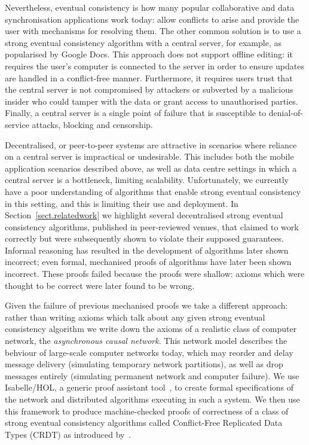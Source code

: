 \documentclass[acmlarge,review,anonymous]{acmart}\settopmatter{printfolios=true}
\begin{document}
Nevertheless, eventual consistency is how many popular collaborative and data synchronisation applications work today: allow
conflicts to arise and provide the user with mechanisms for resolving them.
The other common solution is to use a strong eventual consistency algorithm with a central server, for example, as popularised by Google Docs.
This approach does not support offline editing: it requires the user's computer is connected to the server in order to ensure updates are handled in a conflict-free manner.
Furthermore, it requires users trust that the central server is not compromised by attackers or subverted by a malicious insider who could tamper with the data or grant access to unauthorised parties.
Finally, a central server is a single point of failure that is susceptible to denial-of-service attacks, blocking and censorship.

Decentralised, or peer-to-peer systems are attractive in scenarios where reliance on a central server is impractical or undesirable.
This includes both the mobile application scenarios described above, as well as data centre settings in which a central server is a bottleneck, limiting scalability.
Unfortunately, we currently have a poor understanding of algorithms that enable strong eventual consistency in this setting, and this is limiting their use and deployment.
In Section~\ref{sect.relatedwork} we highlight several decentralised strong eventual consistency algorithms, published in peer-reviewed venues, that claimed to work correctly but were subsequently shown to violate their supposed guarantees. 
Informal reasoning has resulted in the development of algorithms later shown incorrect; even formal, mechanised proofs of algorithms have later been shown incorrect.
These proofs failed because the proofs were shallow: axioms which were thought to be correct were later found to be wrong.

Given the failure of previous mechanised proofs we take a different approach: rather than writing axioms which talk about any given strong eventual consistency algorithm we write down the axioms of a realistic class of computer network, the \emph{asynchronous causal network}.
This network model describes the behviour of large-scale computer networks today, which may reorder and delay message delivery (simulating temporary network partitions), as well as drop messages entirely (simulating permanent network and computer failure).
We use Isabelle/HOL, a generic proof assistant tool~\cite{DBLP:conf/tphol/WenzelPN08}, to create formal specifications of the network and distributed algorithms executing in such a system. 
We then use this framework to produce machine-checked proofs of correctness of a class of strong eventual consistency algorithms called Conflict-Free Replicated Data Types (CRDT) as introduced by~\citet{Shapiro:2011wy,Shapiro:2011un}. 
\end{document}
